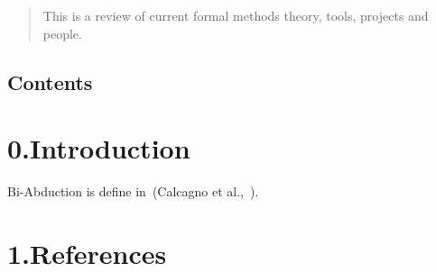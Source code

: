 \documentclass[12pt,twoside]{article}
\begin{document}
\begin{abstract}%

\noindent{}This is a review of current formal methods theory, tools, projects and people.%
\end{abstract}%
\begin{mdtoc}%

\section*{Contents}\label{sec-contents}%

\begin{mdtocblock}%



\end{mdtocblock}%
\end{mdtoc}%

\section{0.\hspace*{0.5em}Introduction}\label{sec-introduction}%

\noindent{}Bi-Abduction is define in~(Calcagno et al.,~).%

\section{1.\hspace*{0.5em}References}\label{sec-references}%
\end{document}
